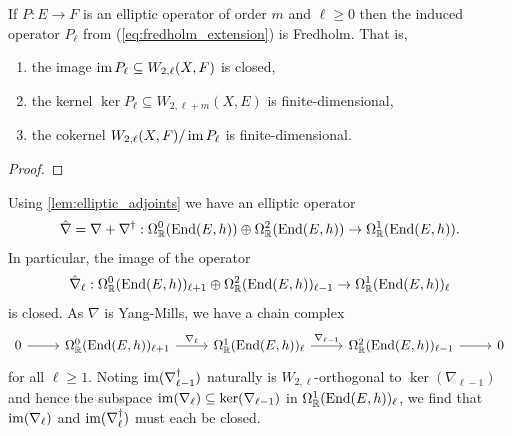 \documentclass[12pt]{ociamthesis}  %
\begin{document}
\begin{theorem}\label{thm:fredholm_extension}
  If $P : E\to F$ is an elliptic operator of order $m$ and $\ell\geq 0$
  then the induced operator $P_\ell$ from (\ref{eq:fredholm_extension})
  is Fredholm. That is,
  \begin{enumerate}
    \item the image $\operatorname{im} P_\ell \subseteq W_{2,\ell}(X,F)$ is closed,
    \item the kernel $\ker P_\ell \subseteq W_{2,\ell+m}(X,E)$ is finite-dimensional,
    \item the cokernel $W_{2,\ell}(X,F)/\operatorname{im} P_\ell$ is finite-dimensional.
  \end{enumerate}
  \begin{proof}
    \missingproof
  \end{proof}
\end{theorem}

\begin{example}\label{ex:nabla_hat_elliptic}
  Using \ref{lem:elliptic_adjoints} we have an elliptic operator
  \begin{align*}
    \hat\nabla = \nabla + \nabla^\dagger :
    \Omega^0_{\mathbb R}(\operatorname{End}(E,h)) \oplus
    \Omega^2_{\mathbb R}(\operatorname{End}(E,h)) \to
    \Omega^1_{\mathbb R}(\operatorname{End}(E,h)).
  \end{align*}
  In particular, the image of the operator
  \begin{align*}
    \hat\nabla_\ell :
    \Omega^0_{\mathbb R}(\operatorname{End}(E,h))_{\ell+1}
    \oplus \Omega^2_{\mathbb R}(\operatorname{End}(E,h))_{\ell-1}
    \to \Omega^1_{\mathbb R}(\operatorname{End}(E,h))_\ell
  \end{align*}
  is closed. As $\nabla$ is Yang-Mills, we have a chain complex 
  \begin{equation*}
    \begin{tikzcd}
      0 & {\Omega^0_{\mathbb R}(\End(E,h))_{\ell+1}} & {\Omega^1_{\mathbb R}(\End(E,h))_\ell} & {\Omega^2_{\mathbb R}(\End(E,h))_{\ell-1}} & 0
      \arrow[from=1-1, to=1-2]
      \arrow["{\nabla_\ell}", from=1-2, to=1-3]
      \arrow["{\nabla_{\ell-1}}", from=1-3, to=1-4]
      \arrow[from=1-4, to=1-5]
    \end{tikzcd}
  \end{equation*}
  for all $\ell\geq 1$.  Noting $\operatorname{im}(\nabla_{\ell-1}^\dagger)$
  naturally is $W_{2,\ell}$-orthogonal to $\ker(\nabla_{\ell-1})$
  and hence the subspace $\operatorname{im}(\nabla_{\ell})\subseteq\ker(\nabla_{\ell-1})$
  in $\Omega^1_{\mathbb R}(\operatorname{End}(E,h))_\ell$, we find that
  $\operatorname{im}(\nabla_\ell)$ and $\operatorname{im}(\nabla_\ell^\dagger)$ must each be
  closed.
\end{example}
\end{document}
